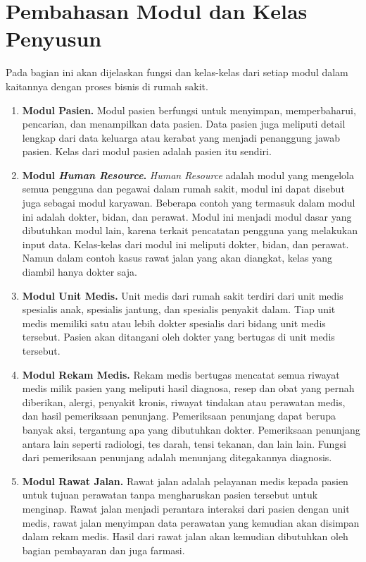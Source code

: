 \section{Pembahasan Modul dan Kelas Penyusun}
Pada bagian ini akan dijelaskan fungsi dan kelas-kelas dari setiap modul dalam kaitannya dengan proses bisnis di rumah sakit.

\begin{enumerate}[leftmargin=*]
	\item \textbf{Modul Pasien.} Modul pasien berfungsi untuk menyimpan, memperbaharui, pencarian, dan menampilkan data pasien. Data pasien juga meliputi detail lengkap dari data keluarga atau kerabat yang menjadi penanggung jawab pasien. Kelas dari modul pasien adalah pasien itu sendiri.
	\item \textbf{Modul \textit{Human Resource}.} \textit{Human Resource} adalah modul yang mengelola semua pengguna dan pegawai dalam rumah sakit, modul ini dapat disebut juga sebagai modul karyawan. Beberapa contoh yang termasuk dalam modul ini adalah dokter, bidan, dan perawat. Modul ini menjadi modul dasar yang dibutuhkan modul lain, karena terkait pencatatan pengguna yang melakukan input data. Kelas-kelas dari modul ini meliputi dokter, bidan, dan perawat. Namun dalam contoh kasus rawat jalan yang akan diangkat, kelas yang diambil hanya dokter saja.
	\item \textbf{Modul Unit Medis.} Unit medis dari rumah sakit terdiri dari unit medis spesialis anak, spesialis jantung, dan spesialis penyakit dalam. Tiap unit medis memiliki satu atau lebih dokter spesialis dari bidang unit medis tersebut. Pasien akan ditangani oleh dokter yang bertugas di unit medis tersebut.
	\item \textbf{Modul Rekam Medis.} Rekam medis bertugas mencatat semua riwayat medis milik pasien yang meliputi hasil diagnosa, resep dan obat yang pernah diberikan, alergi, penyakit kronis, riwayat tindakan atau perawatan medis, dan hasil pemeriksaan penunjang. Pemeriksaan penunjang dapat berupa banyak aksi, tergantung apa yang dibutuhkan dokter. Pemeriksaan penunjang antara lain seperti radiologi, tes darah, tensi tekanan, dan lain lain. Fungsi dari pemeriksaan penunjang adalah menunjang ditegakannya diagnosis.
	\item \textbf{Modul Rawat Jalan.} Rawat jalan adalah pelayanan medis kepada pasien untuk tujuan perawatan tanpa mengharuskan pasien tersebut untuk menginap. Rawat jalan menjadi perantara interaksi dari pasien dengan unit medis, rawat jalan menyimpan data perawatan yang kemudian akan disimpan dalam rekam medis. Hasil dari rawat jalan akan kemudian dibutuhkan oleh bagian pembayaran dan juga farmasi.
\end{enumerate}

